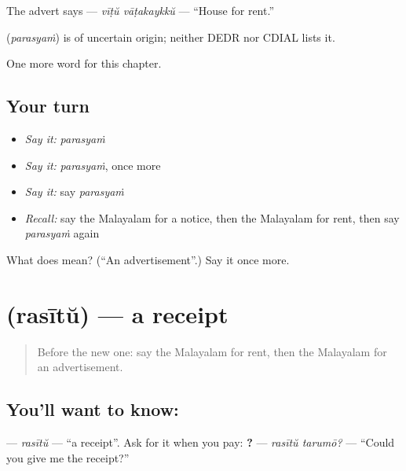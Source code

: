 The advert says \textbf{ } — \emph{vīṭŭ vāṭakaykkŭ} — \textquotedblleft{}House for rent.\textquotedblright{}

\begin{cousinweb}
\textbf{} (\emph{parasyaṁ}) is of uncertain origin; neither DEDR nor CDIAL lists it.
\end{cousinweb}

\begin{grammarlens}[title={What you've built}]
One more word for this chapter.
\end{grammarlens}

\subsection*{Your turn}
\begin{itemize}
\raggedright
  \item \emph{Say it:} \emph{parasyaṁ}
  \item \emph{Say it:} \emph{parasyaṁ}, once more
  \item \emph{Say it:} say \emph{parasyaṁ}
  \item \emph{Recall:} say the Malayalam for a notice, then the Malayalam for rent, then say \emph{parasyaṁ} again
\end{itemize}

\begin{tcolorbox}[breakable,colback=teal!4,colframe=teal!35!black,title={Before you move on}]
What does  mean? (\textquotedblleft{}An advertisement\textquotedblright{}.) Say it once more.
\end{tcolorbox}
\section[\texorpdfstring{\ml{രസീത്} (rasītŭ)}{രസീത് (rasītŭ)}]{ (rasītŭ) — a receipt}

\label{lesson:ML-C180-rasitu}



\begin{quote}
Before the new one: say the Malayalam for rent, then the Malayalam for an advertisement.
\end{quote}

\subsection*{You'll want to know: }
\textbf{} — \emph{rasītŭ} — \textquotedblleft{}a receipt\textquotedblright{}. Ask for it when you pay: \textbf{ ?} — \emph{rasītŭ tarumō?} — \textquotedblleft{}Could you give me the receipt?\textquotedblright{}

